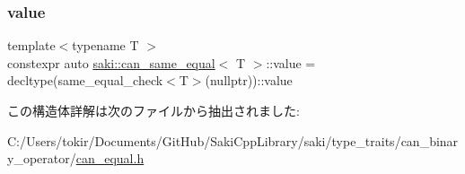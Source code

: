 \subsubsection{\texorpdfstring{value}{value}}
{\footnotesize\ttfamily template$<$typename T $>$ \\
constexpr auto \mbox{\hyperlink{structsaki_1_1can__same__equal}{saki\+::can\+\_\+same\+\_\+equal}}$<$ T $>$\+::value = decltype(same\+\_\+equal\+\_\+check$<$T$>$(nullptr))\+::value\hspace{0.3cm}{\ttfamily [static]}}



この構造体詳解は次のファイルから抽出されました\+:\begin{DoxyCompactItemize}
\item 
C\+:/\+Users/tokir/\+Documents/\+Git\+Hub/\+Saki\+Cpp\+Library/saki/type\+\_\+traits/can\+\_\+binary\+\_\+operator/\mbox{\hyperlink{can__equal_8h}{can\+\_\+equal.\+h}}\end{DoxyCompactItemize}
